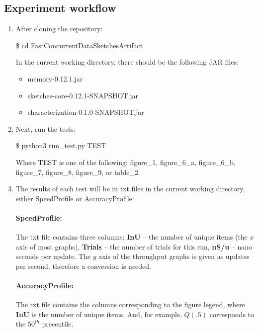 \subsection{Experiment workflow}
\label{fc-sec:workflow}

\begin{enumerate}
  \item After cloning the repository:

  \begin{framed}

  \$ cd FastConcurrentDataSketchesArtifact

  \end{framed}

  \noindent In the current working directory, there should be the following JAR files:

  \begin{itemize}
    \item memory-0.12.1.jar
    \item sketches-core-0.12.1-SNAPSHOT.jar
    \item characterization-0.1.0-SNAPSHOT.jar
  \end{itemize}


  \item Next, run the tests:

  \begin{framed}

  \$ python3 run\_test.py TEST

  \end{framed}

  \noindent Where TEST is one of the following: figure\_1, figure\_6\_a, figure\_6\_b, figure\_7, figure\_8, figure\_9, or table\_2.


  \item \label{fc-n:run-test} The results of each test will be in txt files in the current working directory, either SpeedProfile or AccuracyProfile:
  \paragraph{\textbf{SpeedProfile:}} The txt file contains three columns: \textbf{InU} -- the number of unique items (the $x$
  axis of most graphs), \textbf{Trials} -- the number of trials for this run, \textbf{nS/u} -- nano seconds per update. The $y$
  axis of the throughput graphs is given as updates per second, therefore a conversion is needed.
  \paragraph{\textbf{AccuracyProfile:}} The txt file contains the columns corresponding to the figure legend, where
  \textbf{InU} is the number of unique items. And, for example, $Q(.5)$ corresponds to the $50^{th}$ precentile.

\end{enumerate}


